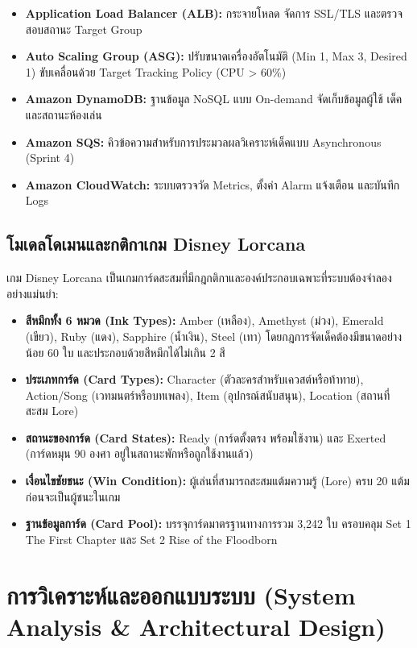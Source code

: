 \documentclass[12pt,a4paper]{report}
\begin{document}
\begin{enumerate}
\begin{itemize}
        \item \textbf{Application Load Balancer (ALB):} กระจายโหลด จัดการ SSL/TLS และตรวจสอบสถานะ Target Group
        \item \textbf{Auto Scaling Group (ASG):} ปรับขนาดเครื่องอัตโนมัติ (Min 1, Max 3, Desired 1) ขับเคลื่อนด้วย Target Tracking Policy (CPU > 60\%)
        \item \textbf{Amazon DynamoDB:} ฐานข้อมูล NoSQL แบบ On-demand จัดเก็บข้อมูลผู้ใช้ เด็ค และสถานะห้องเล่น
        \item \textbf{Amazon SQS:} คิวข้อความสำหรับการประมวลผลวิเคราะห์เด็คแบบ Asynchronous (Sprint 4)
        \item \textbf{Amazon CloudWatch:} ระบบตรวจวัด Metrics, ตั้งค่า Alarm แจ้งเตือน และบันทึก Logs
    \end{itemize}
\end{enumerate}

\section{โมเดลโดเมนและกติกาเกม Disney Lorcana}
เกม Disney Lorcana เป็นเกมการ์ดสะสมที่มีกฎกติกาและองค์ประกอบเฉพาะที่ระบบต้องจำลองอย่างแม่นยำ:
\begin{itemize}
    \item \textbf{สีหมึกทั้ง 6 หมวด (Ink Types):} Amber (เหลือง), Amethyst (ม่วง), Emerald (เขียว), Ruby (แดง), Sapphire (น้ำเงิน), Steel (เทา) โดยกฎการจัดเด็คต้องมีขนาดอย่างน้อย 60 ใบ และประกอบด้วยสีหมึกได้ไม่เกิน 2 สี
    \item \textbf{ประเภทการ์ด (Card Types):} Character (ตัวละครสำหรับเควสต์หรือท้าทาย), Action/Song (เวทมนตร์หรือบทเพลง), Item (อุปกรณ์สนับสนุน), Location (สถานที่สะสม Lore)
    \item \textbf{สถานะของการ์ด (Card States):} Ready (การ์ดตั้งตรง พร้อมใช้งาน) และ Exerted (การ์ดหมุน 90 องศา อยู่ในสถานะพักหรือถูกใช้งานแล้ว)
    \item \textbf{เงื่อนไขชัยชนะ (Win Condition):} ผู้เล่นที่สามารถสะสมแต้มความรู้ (Lore) ครบ 20 แต้มก่อนจะเป็นผู้ชนะในเกม
    \item \textbf{ฐานข้อมูลการ์ด (Card Pool):} บรรจุการ์ดมาตรฐานทางการรวม 3,242 ใบ ครอบคลุม Set 1 The First Chapter และ Set 2 Rise of the Floodborn
\end{itemize}

\chapter{การวิเคราะห์และออกแบบระบบ (System Analysis \& Architectural Design)}
\end{document}
